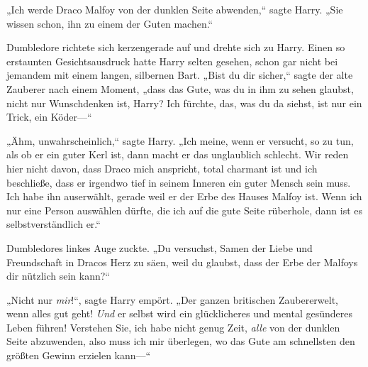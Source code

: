 „Ich werde Draco Malfoy von der dunklen Seite abwenden,“ sagte Harry. „Sie wissen schon, ihn zu einem der Guten machen.“

Dumbledore richtete sich kerzengerade auf und drehte sich zu Harry. Einen so erstaunten Gesichtsausdruck hatte Harry selten gesehen, schon gar nicht bei jemandem mit einem langen, silbernen Bart. „Bist du dir sicher,“ sagte der alte Zauberer nach einem Moment, „dass das Gute, was du in ihm zu sehen glaubst, nicht nur Wunschdenken ist, Harry? Ich fürchte, das, was du da siehst, ist nur ein Trick, ein Köder—“

„Ähm, unwahrscheinlich,“ sagte Harry. „Ich meine, wenn er versucht, so zu tun, als ob er ein guter Kerl ist, dann macht er das unglaublich schlecht. Wir reden hier nicht davon, dass Draco mich anspricht, total charmant ist und ich beschließe, dass er irgendwo tief in seinem Inneren ein guter Mensch sein muss. Ich habe ihn auserwählt, gerade weil er der Erbe des Hauses Malfoy ist. Wenn ich nur eine Person auswählen dürfte, die ich auf die gute Seite rüberhole, dann ist es selbstverständlich er.“

Dumbledores linkes Auge zuckte. „Du versuchst, Samen der Liebe und Freundschaft in Dracos Herz zu säen, weil du glaubst, dass der Erbe der Malfoys dir nützlich sein kann?“

„Nicht nur \emph{mir}!“, sagte Harry empört. „Der ganzen britischen Zaubererwelt, wenn alles gut geht! \emph{Und} er selbst wird ein glücklicheres und mental gesünderes Leben führen! Verstehen Sie, ich habe nicht genug Zeit, \emph{alle} von der dunklen Seite abzuwenden, also muss ich mir überlegen, wo das Gute am schnellsten den größten Gewinn erzielen kann—“

